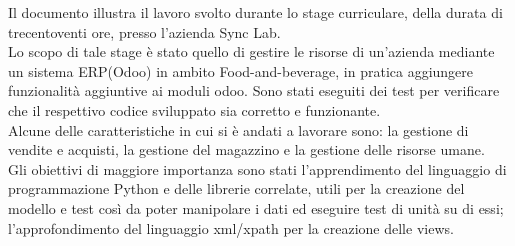 
Il documento illustra il lavoro svolto durante lo stage curriculare, della durata di trecentoventi ore, presso l’azienda Sync Lab.\\
Lo scopo di tale stage è stato quello di gestire le risorse di un'azienda mediante un sistema ERP(Odoo) in ambito Food-and-beverage, in pratica aggiungere funzionalità aggiuntive ai moduli odoo.
Sono stati eseguiti dei test per verificare che il respettivo codice sviluppato sia corretto e funzionante.\\
Alcune delle caratteristiche in cui si è andati a lavorare sono: la gestione di vendite e acquisti, la gestione del magazzino e la gestione delle risorse umane.
\newline
\\
Gli obiettivi di maggiore importanza sono stati l'apprendimento del linguaggio di programmazione Python e delle librerie correlate, utili per la creazione del modello e test così da poter manipolare i dati ed eseguire test di unità su di essi; l'approfondimento del linguaggio xml/xpath per la creazione delle views.
